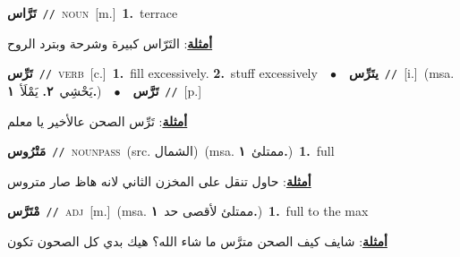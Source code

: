 \documentclass[10pt,a4paper,twoside]{article} %
\begin{document}
\begin{multicols}{2}
{{{{{{{{\setlength\topsep{0pt}\textbf{\foreignlanguage{arabic}{تَرَّاس}}\ {\color{gray}\texttt{//}\color{black}}\ \textsc{noun}\ [m.]\ \textbf{1.}~terrace\  \begin{flushright}\color{gray}\foreignlanguage{arabic}{\textbf{\underline{\foreignlanguage{arabic}{أمثلة}}}: التَرّاس كبيرة وشرحة وبترد الروح}\end{flushright}\color{black}} \vspace{2mm}

{\setlength\topsep{0pt}\textbf{\foreignlanguage{arabic}{تَرِّس}}\ {\color{gray}\texttt{//}\color{black}}\ \textsc{verb}\ [c.]\ \textbf{1.}~fill excessively.  \textbf{2.}~stuff excessively\ \ $\bullet$\ \ \setlength\topsep{0pt}\textbf{\foreignlanguage{arabic}{يتَرِّس}}\ {\color{gray}\texttt{//}\color{black}}\ [i.]\ \color{gray}(msa. \foreignlanguage{arabic}{يَحْشِي}~\foreignlanguage{arabic}{\textbf{٢.}}  \foreignlanguage{arabic}{يَمْلَأ}~\foreignlanguage{arabic}{\textbf{١.}})\color{black}\ \ $\bullet$\ \ \setlength\topsep{0pt}\textbf{\foreignlanguage{arabic}{تَرَّس}}\ {\color{gray}\texttt{//}\color{black}}\ [p.]\  \begin{flushright}\color{gray}\foreignlanguage{arabic}{\textbf{\underline{\foreignlanguage{arabic}{أمثلة}}}: تَرِّس الصحن عالأخير يا معلم}\end{flushright}\color{black}} \vspace{2mm}

{\setlength\topsep{0pt}\textbf{\foreignlanguage{arabic}{مَتْرُوس}}\ {\color{gray}\texttt{//}\color{black}}\ \textsc{noun\textunderscore pass}\ (src. \color{gray}\foreignlanguage{arabic}{الشمال}\color{black})\ \color{gray}(msa. \foreignlanguage{arabic}{ممتلئ}~\foreignlanguage{arabic}{\textbf{١.}})\color{black}\ \textbf{1.}~full\  \begin{flushright}\color{gray}\foreignlanguage{arabic}{\textbf{\underline{\foreignlanguage{arabic}{أمثلة}}}: حاول تنقل على المخزن الثاني لانه هاظ صار متروس}\end{flushright}\color{black}} \vspace{2mm}

{\setlength\topsep{0pt}\textbf{\foreignlanguage{arabic}{مْتَرَّس}}\ {\color{gray}\texttt{//}\color{black}}\ \textsc{adj}\ [m.]\ \color{gray}(msa. \foreignlanguage{arabic}{ممتلئ لأقصى حد}~\foreignlanguage{arabic}{\textbf{١.}})\color{black}\ \textbf{1.}~full to the max\  \begin{flushright}\color{gray}\foreignlanguage{arabic}{\textbf{\underline{\foreignlanguage{arabic}{أمثلة}}}: شايف كيف الصحن مترَّس ما شاء الله؟ هيك بدي كل الصحون تكون}\end{flushright}\color{black}} \vspace{2mm}

}}}}}}}
\end{multicols}
\end{document}
